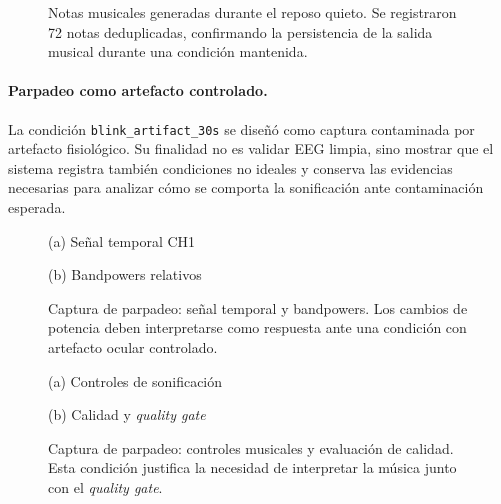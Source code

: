 \documentclass[../main.tex]{subfiles}
\begin{document}
\begin{figure}[htbp]
    \centering
    \caption{Notas musicales generadas durante el reposo quieto. Se registraron 72 notas deduplicadas, confirmando la persistencia de la salida musical durante una condición mantenida.}
    \label{fig:validacion_s01_03_notes}
\end{figure}

\paragraph{Parpadeo como artefacto controlado.}
La condición \texttt{blink\_artifact\_30s} se diseñó como captura contaminada por artefacto fisiológico. Su finalidad no es validar EEG limpia, sino mostrar que el sistema registra también condiciones no ideales y conserva las evidencias necesarias para analizar cómo se comporta la sonificación ante contaminación esperada.

\begin{figure}[htbp]
    \centering
    \begin{minipage}{0.49\textwidth}
        \centering
        \small (a) Señal temporal CH1
    \end{minipage}
    \hfill
    \begin{minipage}{0.49\textwidth}
        \centering
        \small (b) Bandpowers relativos
    \end{minipage}
    \caption{Captura de parpadeo: señal temporal y bandpowers. Los cambios de potencia deben interpretarse como respuesta ante una condición con artefacto ocular controlado.}
    \label{fig:validacion_s01_04_eeg_bands}
\end{figure}

\begin{figure}[htbp]
    \centering
    \begin{minipage}{0.49\textwidth}
        \centering
        \small (a) Controles de sonificación
    \end{minipage}
    \hfill
    \begin{minipage}{0.49\textwidth}
        \centering
        \small (b) Calidad y \textit{quality gate}
    \end{minipage}
    \caption{Captura de parpadeo: controles musicales y evaluación de calidad. Esta condición justifica la necesidad de interpretar la música junto con el \textit{quality gate}.}
    \label{fig:validacion_s01_04_controls_quality}
\end{figure}
\end{document}
